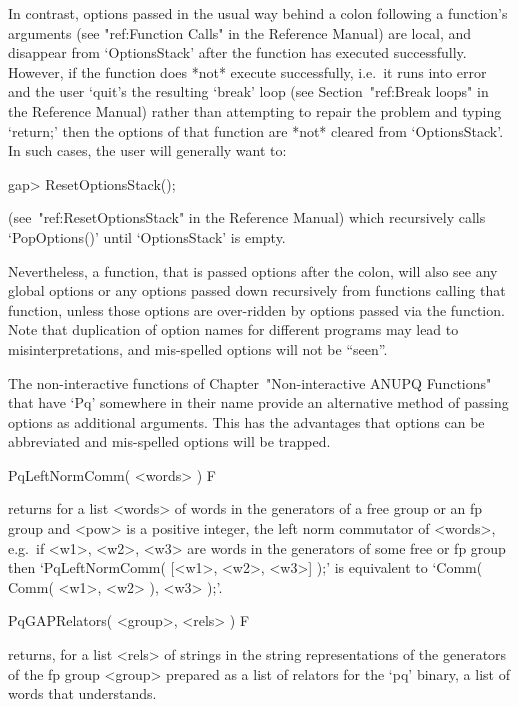 In contrast, options passed in the usual way behind a colon  following  a
function's arguments (see "ref:Function Calls" in  the  {\GAP}  Reference
Manual) are local, and disappear from `OptionsStack' after  the  function
has executed successfully. However, if the function  does  *not*  execute
successfully, i.e.~it runs into error and the user `quit's the  resulting
`break' loop (see Section~"ref:Break  loops"  in  the  Reference  Manual)
rather than attempting to repair the problem and  typing  `return;'  then
the options of that function are *not* cleared  from  `OptionsStack'.  In
such cases, the user will generally want to:

\begintt
gap> ResetOptionsStack();
\endtt

(see~"ref:ResetOptionsStack" in the Reference Manual)  which  recursively
calls `PopOptions()' until `OptionsStack' is empty.

Nevertheless, a function, that is passed options after  the  colon,  will
also see any global options or any options passed down  recursively  from
functions calling that function, unless those options are over-ridden  by
options passed via the function. Note that duplication  of  option  names
for different programs may lead to  misinterpretations,  and  mis-spelled
options will not be ``seen''.

The   non-interactive   functions   of   Chapter~"Non-interactive   ANUPQ
Functions" that have `Pq' somewhere in their name provide an  alternative
method  of  passing  options  as  additional  arguments.  This  has   the
advantages that options can be abbreviated and mis-spelled  options  will
be trapped.


\>PqLeftNormComm( <words> ) F

returns for a list <words> of words in the generators of a free group  or
an fp group and <pow> is a positive integer, the left norm commutator  of
<words>, e.g.~if <w1>, <w2>, <w3> are words in  the  generators  of  some
free or  fp  group  then  `PqLeftNormComm(  [<w1>,  <w2>,  <w3>]  );'  is
equivalent to `Comm( Comm( <w1>, <w2> ), <w3> );'.

\>PqGAPRelators( <group>, <rels> ) F

returns, for a list <rels> of strings in the  string  representations  of
the generators of the fp group <group> prepared as a list of relators for 
the `pq' binary, a list of words that {\GAP} understands.

